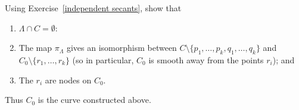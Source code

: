 \begin{exercise}
Using Exercise~\ref{independent secants}, show that 
\begin{enumerate}
\item $\Lambda \cap C = \emptyset$:
\item The map $\pi_\Lambda$ gives an isomorphism between $C \setminus \{p_1,\dots,p_k, q_1,\dots, q_k\}$ and $C_0 \setminus \{r_1,\dots,r_k\}$ (so in particular, $C_0$ is smooth away from the points $r_i$); and
\item The $r_i$ are nodes on $C_0$.
\end{enumerate}
\end{exercise}

Thus $C_0$ is the curve constructed above.


